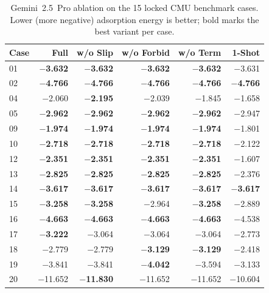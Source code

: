 \documentclass[%
 preprint,
 superscriptaddress,
 amsmath,amssymb,
 aps,
 prb,
 floatfix,
]{revtex4-2}
\begin{document}
\begin{table}[ht]
\centering
\small
\caption{Gemini~2.5~Pro ablation on the 15 locked CMU benchmark cases. Lower (more negative) adsorption energy is better; bold marks the best variant per case.}
\label{tab:si-ablation-gemini}
\begin{tabular}{lrrrrr}
\toprule
Case & Full & w/o Slip & w/o Forbid & w/o Term & 1-Shot \\
\midrule
01 & \textbf{$-$3.632} & \textbf{$-$3.632} & \textbf{$-$3.632} & \textbf{$-$3.632} & $-$3.631 \\
02 & \textbf{$-$4.766} & \textbf{$-$4.766} & \textbf{$-$4.766} & \textbf{$-$4.766} & \textbf{$-$4.766} \\
04 & $-$2.060 & \textbf{$-$2.195} & $-$2.039 & $-$1.845 & $-$1.658 \\
05 & \textbf{$-$2.962} & \textbf{$-$2.962} & \textbf{$-$2.962} & \textbf{$-$2.962} & $-$2.947 \\
09 & \textbf{$-$1.974} & \textbf{$-$1.974} & \textbf{$-$1.974} & \textbf{$-$1.974} & $-$1.801 \\
10 & \textbf{$-$2.718} & \textbf{$-$2.718} & \textbf{$-$2.718} & \textbf{$-$2.718} & $-$2.122 \\
12 & \textbf{$-$2.351} & \textbf{$-$2.351} & \textbf{$-$2.351} & \textbf{$-$2.351} & $-$1.607 \\
13 & \textbf{$-$2.825} & \textbf{$-$2.825} & \textbf{$-$2.825} & \textbf{$-$2.825} & $-$2.376 \\
14 & \textbf{$-$3.617} & \textbf{$-$3.617} & \textbf{$-$3.617} & \textbf{$-$3.617} & \textbf{$-$3.617} \\
15 & \textbf{$-$3.258} & \textbf{$-$3.258} & $-$2.964 & \textbf{$-$3.258} & $-$2.889 \\
16 & \textbf{$-$4.663} & \textbf{$-$4.663} & \textbf{$-$4.663} & \textbf{$-$4.663} & $-$4.538 \\
17 & \textbf{$-$3.222} & $-$3.064 & $-$3.064 & $-$3.064 & $-$2.773 \\
18 & $-$2.779 & $-$2.779 & \textbf{$-$3.129} & \textbf{$-$3.129} & $-$2.418 \\
19 & $-$3.841 & $-$3.841 & \textbf{$-$4.042} & $-$3.594 & $-$3.133 \\
20 & $-$11.652 & \textbf{$-$11.830} & $-$11.652 & $-$11.652 & $-$10.604 \\
\bottomrule
\end{tabular}
\end{table}
\end{document}
